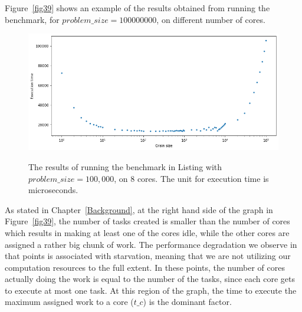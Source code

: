 
Figure~\ref{fig39} shows an example of the results obtained from running the benchmark, for $problem\_size=100000000$, on different number of cores.
\begin{figure}[H]
	\centering
	{\includegraphics[scale=.45]{images/hpx_for_loop/100000_8.png}}
	\caption{The results of running the benchmark in Listing with $problem\_size=100,000$, on 8 cores. The unit for execution time is microseconds.}\label{fig41}		
\end{figure}



As stated in Chapter~\ref{Background}, at the right hand side of the graph in Figure~\ref{fig39}, the number of tasks created is smaller than the number of cores which results in making at least one of the cores idle, while the other cores are assigned a rather big chunk of work. The performance degradation we observe in that points is associated with starvation, meaning that we are not utilizing our computation resources to the full extent. In these points, the number of cores actually doing the work is equal to the number of the tasks, since each core gets to execute at most one task. At this region of the graph, the time to execute the maximum assigned work to a core ($t\_c$) is the dominant factor.   


